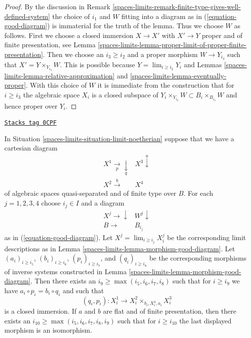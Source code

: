 \begin{proof}
By the discussion in
Remark \ref{spaces-limits-remark-finite-type-gives-well-defined-system}
the choice of $i_1$ and $W$ fitting into a diagram as in
(\ref{equation-good-diagram}) is immaterial for the truth of
the lemma. Thus we choose $W$ as follows.
First we choose a closed immersion $X \to X'$
with $X' \to Y$ proper and of finite presentation, see
Lemma \ref{spaces-limits-lemma-proper-limit-of-proper-finite-presentation}.
Then we choose an $i_3 \geq i_2$ and a proper morphism $W \to Y_{i_3}$
such that $X' = Y \times_{Y_{i_3}} W$. This is possible because
$Y = \lim_{i \geq i_2} Y_i$ and
Lemmas \ref{spaces-limits-lemma-relative-approximation} and \ref{spaces-limits-lemma-eventually-proper}.
With this choice of $W$ it is immediate from the construction that
for $i \geq i_3$ the algebraic space $X_i$ is a closed subspace of
$Y_i \times_{Y_{i_3}} W \subset B_i \times_{B_{i_3}} W$
and hence proper over $Y_i$.
\end{proof}

\begin{lemma}
\label{spaces-limits-lemma-good-diagram-fibre-product}
\href{https://stacks.math.columbia.edu/tag/0CPF}{\texttt{Stacks tag 0CPF}}

In Situation \ref{spaces-limits-situation-limit-noetherian} suppose that we have a
cartesian diagram
$$
\begin{array}{cc}X^1 \underset{p}{\longrightarrow}\underset{q}{\downarrow} & X^3 \overset{a}{\downarrow} \\ X^2 \overset{b}{\longrightarrow} & X^4\end{array}
$$
of algebraic spaces quasi-separated and of finite type over $B$.
For each $j = 1, 2, 3, 4$ choose $i_j \in I$ and a diagram
$$
\begin{array}{cc}X^j \longrightarrow\downarrow & W^j \downarrow \\ B \longrightarrow & B_{i_j}\end{array}
$$
as in (\ref{equation-good-diagram}). Let
$X^j = \lim_{i \geq i_j} X^j_i$ be the corresponding limit descriptions
as in Lemma \ref{spaces-limits-lemma-morphism-good-diagram}.
Let $(a_i)_{i \geq i_5}$, $(b_i)_{i \geq i_6}$, $(p_i)_{i \geq i_7}$, and
$(q_i)_{i \geq i_8}$ be the corresponding morphisms of inverse systems
constructed in Lemma \ref{spaces-limits-lemma-morphism-good-diagram}. Then there exists an
$i_9 \geq \max(i_5, i_6, i_7, i_8)$ such that for $i \geq i_9$ we have
$a_i \circ p_i = b_i \circ q_i$ and such that
$$
(q_i, p_i) : X^1_i \longrightarrow X^2_i \times_{b_i, X^4_i, a_i} X^3_i
$$
is a closed immersion.
If $a$ and $b$ are flat and of finite presentation, then there exists an
$i_{10} \geq \max(i_5, i_6, i_7, i_8, i_9)$ such that for $i \geq i_{10}$
the last displayed morphism is an isomorphism.
\end{lemma}

